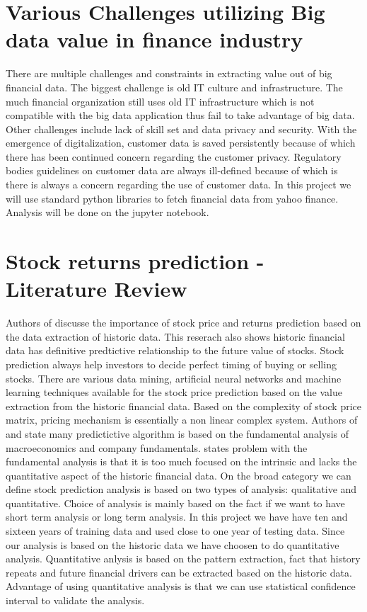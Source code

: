 \section{Various Challenges utilizing Big data value in finance industry }

There are multiple challenges and constraints in extracting value out of big financial data. The biggest challenge is old IT culture and infrastructure.
 The much financial organization still uses old IT infrastructure which is not compatible with the big data application thus fail to take advantage of big data.
 Other challenges include lack of skill set and data privacy and security. With the emergence of digitalization, customer data is saved persistently because of 
 which there has been continued concern regarding the customer privacy. Regulatory bodies guidelines on customer data are always ill-defined because of which is
 there is always a concern regarding the use of customer data.  In this project we will use standard python libraries to fetch financial data from yahoo finance. 
 Analysis will be done on the jupyter notebook. 
 
\section{Stock returns prediction - Literature Review}

Authors of \cite{Ref8} discusse the importance of stock price and returns prediction based on the data extraction of historic data. This reserach \cite{Ref8}
also shows historic financial data has definitive predtictive relationship to the future value of stocks. Stock prediction always help investors to decide perfect
timing of buying or selling stocks. There are various data mining, artificial neural networks and machine learning techniques available for the stock price prediction based on the value
extraction from the historic financial data. Based on the complexity of stock price matrix, pricing mechanism is essentially a non linear complex system. 
Authors of \cite{Ref9} and \cite{Ref10} state many predictictive algorithm is based on the fundamental analysis of macroeconomics and company fundamentals.
\cite{Ref11} states problem with the fundamental analysis is that it is too much focused on the intrinsic and lacks the quantitative aspect of the historic financial
data. On the broad category we can define stock prediction analysis is based on two types of analysis: qualitative and quantitative. Choice of analysis is mainly 
based on the fact if we want to have short term analysis or long term analysis. In this project we have have ten and sixteen years of training data and used close to 
one year of testing data. Since our analysis is based on the historic data we have choosen to do quantitative analysis. Quantitative anlysis is based on the pattern 
extraction, fact that history repeats and future financial drivers can be extracted based on the historic data. Advantage of using quantitative analysis is that we 
can use statistical confidence interval to validate the analysis. 

